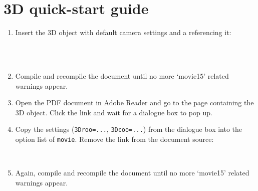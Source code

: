 \documentclass[a4paper]{article}
\begin{document}
\section{3D quick-start guide}\hypertarget{sec:3Dtut}{}
\begin{enumerate}
  \item Insert the 3D object with default camera settings and a {\tt \string\movieref} referencing it:

  {\tt%
    \string{}\string{\\
	\phantom{xx}.5\string\linewidth\\
	\string}\string{\\
	\phantom{xx}.5\string\linewidth\\
	\string}\string\\\\
    \string\movieref[3Dcalculate]
  }

  \item Compile and recompile the document until no more `movie15' related warnings appear.
  \item Open the PDF document in Adobe Reader and go to the page containing the 3D object. Click the link and wait for a dialogue box to pop up.
  \item Copy the settings ({\tt 3Droo=...}, {\tt 3Dcoo=...}) from the dialogue box into the option list of {\tt \string\-movie}. Remove the link from the document source:

  {\tt%
    \string{}\string{\\
	\phantom{xx}.5\string\linewidth\\
	\string}\string{\\
	\phantom{xx}.5\string\linewidth\\
	\string}
  }

  \item Again, compile and recompile the document until no more `movie15' related warnings appear.
  \xdef\lastcount{\theenumi}
\end{enumerate}
\end{document}
